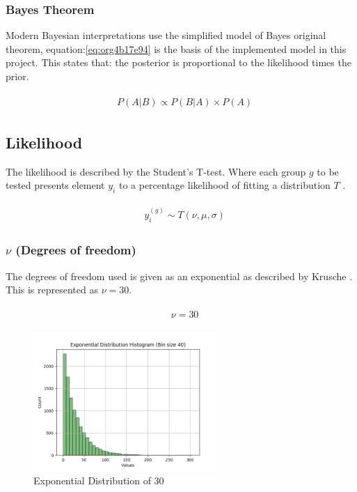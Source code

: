 \documentclass[11pt]{report}
\begin{document}
\subsubsection{Bayes Theorem}
\label{sec:org57b42d8}

Modern Bayesian interpretations use the simplified model of Bayes original theorem, equation:\ref{eq:org4b17e94} is the basis of the implemented model in this project. This states that: the posterior is proportional to the likelihood times the prior.

\begin{align}
\label{eq:org4b17e94}
  &\begin{aligned}
  P(A|B) \propto P(B|A) \times P(A)
  \end{aligned}
\end{align}


\subsection{Likelihood}
\label{sec:org649cdb6}
The likelihood is described by the Student's T-test. Where each group \(g\) to be tested presents element \(y_i\) to a percentage likelihood of fitting a distribution \(T\) .

 \begin{align}
\label{eq:orgf18bbb4}
   &\begin{aligned}
y_i^{(g)} \sim T(\nu, \mu, \sigma)
   \end{aligned}
 \end{align}

\subsubsection{\(\nu\) (Degrees of freedom)}
\label{sec:orgbde27dc}
The degrees of freedom used is given as an exponential as described by
Krusche \cite{Kruschke2012}. This is represented as \(\nu = 30\).

 \begin{align}
\label{eq:orgd1e5745}
   &\begin{aligned}
\nu = 30
   \end{aligned}
 \end{align}

\begin{figure}[htbp]
\centering
\includegraphics[width=7cm]{./images/dist2.png}
\caption{\label{fig:org5466ef6}
Exponential Distribution of 30}
\end{figure}
\end{document}
